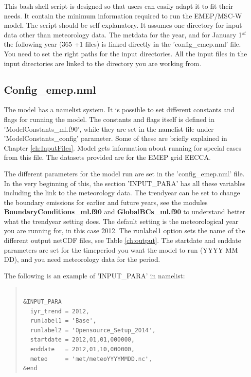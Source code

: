 \documentclass[a4paper,12pt]{report}
\begin{document}
This bash shell script is designed so that users can easily 
adapt it to fit their needs. It contain the minimum information 
required to run the EMEP/MSC-W model. 
The script should be self-explanatory. It assumes one directory for input data other than meteorology data. 
The metdata for the year, and for January 1$^{st}$ the following year (365 +1 files) is linked directly in the
'config\_emep.nml' file. 
You need to set the right paths 
for the input directories.  
All the input files in the input directories are linked to the directory you are working from. 

\subsection{Config\_emep.nml}

The model has a namelist system.  It is possible to set different constants and 
flags for running the model.  The constants and flags itself
is defined in 'ModelConstants\_ml.f90', while they are set in the namelist file under
'ModelConstants\_config' parameter. 
Some of these are briefly explained in Chapter \ref{ch:InputFiles}. 
 Model gets information about running for special cases from this 
file.  The datasets provided are for the EMEP grid EECCA. 

The different parameters for the model run are set in the 'config\_emep.nml' file.  In the very beginning 
of this, the section 'INPUT\_PARA' has all these variables including the link to the meteorology data. 
The trendyear can be set to change the boundary emissions for 
earlier and future years, see the modules {\bf BoundaryConditions\_ml.f90 } 
and {\bf GlobalBCs\_ml.f90 } to understand better what the trendyear 
setting does. The default setting is the meteorological year you are running for, in this case 2012. 
The runlabel1 option sets the name of the different output netCDF 
files, see Table \ref{ch:output}. 
The startdate and enddate parameters are set for the timeperiod you want the model 
to run (YYYY MM DD), and you need meteorology data for the period.

The following is an example of 'INPUT\_PARA' in namelist:

\begin{quote}
\begin{verbatim}

&INPUT_PARA
  iyr_trend = 2012,
  runlabel1 = 'Base',
  runlabel2 = 'Opensource_Setup_2014',
  startdate = 2012,01,01,000000,
  enddate   = 2012,01,10,000000,
  meteo     = 'met/meteoYYYYMMDD.nc',
&end

\end{verbatim}
\end{quote}
 
\end{document}
